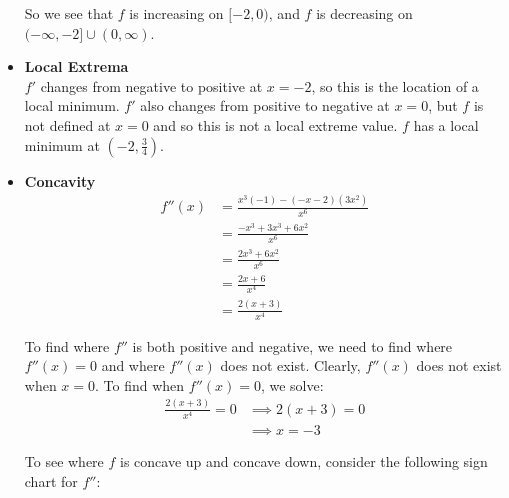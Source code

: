 \documentclass[nooutcomes]{ximera}
\renewenvironment{freeResponse}{
\ifhandout\setbox0\vbox\bgroup\else
\begin{trivlist}\item[\hskip \labelsep\bfseries Solution:\hspace{2ex}]
\fi}
{\ifhandout\egroup\else
\end{trivlist}
\fi}
\newcommand{\dfn}{\textbf}
\begin{document}
\begin{problem}
\begin{freeResponse}
\begin{itemize}
       So we see that $f$ is increasing on $[-2,0)$, and $f$ is decreasing on $(-\infty, -2] \cup (0,\infty)$.
       
     \item
       \dfn{Local Extrema}  \\
       $f'$ changes from negative to positive at $x=-2$, so this is the location of a local minimum.
       $f'$ also changes from positive to negative at $x=0$, but $f$ is not defined at $x=0$ and so this is not a local extreme value.
       $f$ has a local minimum at $\left( -2,\frac{3}{4} \right)$.
			
			
			
     \item
       \dfn{Concavity}
       \begin{align*}
         f''(x) &= \frac{x^3(-1) - (-x-2)(3x^2)}{x^6} \\
                &= \frac{-x^3 + 3x^3 + 6x^2}{x^6} \\
		&= \frac{2x^3 + 6x^2}{x^6} \\
		&= \frac{2x+6}{x^4} \\
		&= \frac{2(x+3)}{x^4}
       \end{align*}
			
       To find where $f''$ is both positive and negative, we need to find where $f''(x) = 0$ and where $f''(x)$ does not exist.
       Clearly, $f''(x)$ does not exist when $x=0$.
       To find when $f''(x) = 0$, we solve:
       \begin{align*}
         \frac{2(x+3)}{x^4} = 0 &\implies 2(x+3) = 0\\
         &\implies x=-3
       \end{align*}
			
       To see where $f$ is concave up and concave down, consider the following sign chart for $f''$:
       \begin{center}
         \begin{image}
         \end{image}
       \end{center}


\end{itemize}
\end{freeResponse}
\end{problem}
\end{document}
